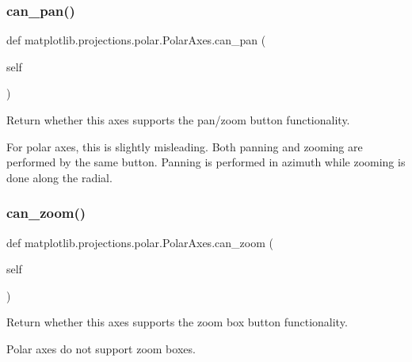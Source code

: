 \subsubsection{\texorpdfstring{can\+\_\+pan()}{can\_pan()}}
{\footnotesize\ttfamily def matplotlib.\+projections.\+polar.\+Polar\+Axes.\+can\+\_\+pan (\begin{DoxyParamCaption}\item[{}]{self }\end{DoxyParamCaption})}

\begin{DoxyVerb}Return whether this axes supports the pan/zoom button functionality.

For polar axes, this is slightly misleading. Both panning and
zooming are performed by the same button. Panning is performed
in azimuth while zooming is done along the radial.
\end{DoxyVerb}
 \mbox{\label{classmatplotlib_1_1projections_1_1polar_1_1PolarAxes_a4b83eec5651da5a801157107fd0d7f01}} 
\subsubsection{\texorpdfstring{can\+\_\+zoom()}{can\_zoom()}}
{\footnotesize\ttfamily def matplotlib.\+projections.\+polar.\+Polar\+Axes.\+can\+\_\+zoom (\begin{DoxyParamCaption}\item[{}]{self }\end{DoxyParamCaption})}

\begin{DoxyVerb}Return whether this axes supports the zoom box button functionality.

Polar axes do not support zoom boxes.
\end{DoxyVerb}
 \mbox{\label{classmatplotlib_1_1projections_1_1polar_1_1PolarAxes_ab6af7af6d79ab643260ab6ac6795d2bf}} 
